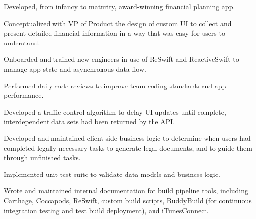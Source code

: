 \documentclass[]{jhearn-resume}
\begin{document}
\begin{minipage}[t]{0.67\textwidth}
\begin{tightemize}
\item Developed, from infancy to maturity, \href{https://web.archive.org/web/20210728190109/https://tomorrow.me/trust-worthy/tomorrow-news/tomorrow-wins-at-plug-and-play-winter-summit/}{award-winning} financial planning app.
\item  Conceptualized with VP of Product the design of custom UI to collect and present detailed financial information in a way that was easy for users to understand.
\item  Onboarded and trained new engineers in use of ReSwift and ReactiveSwift to manage app state and asynchronous data flow.
\item  Performed daily code reviews to improve team coding standards and app performance.
\item  Developed a traffic control algorithm to delay UI updates until complete, interdependent data sets had been returned by the API.
\item  Developed and maintained client-side business logic to determine when users had completed legally necessary tasks to generate legal documents, and to guide them through unfinished tasks.
\item  Implemented unit test suite to validate data models and business logic.
\item  Wrote and maintained internal documentation for build pipeline tools, including Carthage, Cocoapods, ReSwift, custom build scripts, BuddyBuild (for continuous integration testing and test build deployment), and iTunesConnect.
\end{tightemize}
\sectionsep

\end{minipage} 
\hfill
\end{document}
